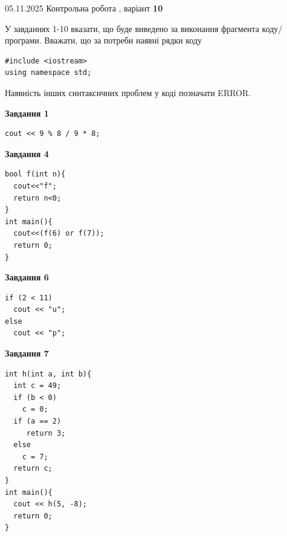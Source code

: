 \documentclass[12pt, ukrainian]{article}
\begin{document}
{\Large{05.11.2025 Контрольна робота , варіант  \No \textbf { 10 }\par}}
{
\begin {large}
У завданнях 1-10 вказати, що буде виведено за виконання фрагмента коду/про\-гра\-ми.
Вважати, що за потреби наявні рядки коду
\begin{verbatim}
#include <iostream>
using namespace std;
\end{verbatim}
Наявність інших синтаксичних проблем у коді позначати ERROR.

\begin{minipage}[t]{7.0cm}

\begin{center}
\textbf{Завдання 1}
\end{center}
\vspace{-8mm}

\begin{verbatim}
cout << 9 % 8 / 9 * 8;
\end{verbatim}



\begin{center}
\textbf{Завдання 4}
\end{center}
\vspace{-8mm}

\begin{verbatim}
bool f(int n){
  cout<<"f";
  return n<0;
}
int main(){
  cout<<(f(6) or f(7));
  return 0;
}
\end{verbatim}



\begin{center}
\textbf{Завдання 6}
\end{center}
\vspace{-8mm}

\begin{verbatim}
if (2 < 11)
  cout << "u";
else
  cout << "p";
\end{verbatim}



\begin{center}
\textbf{Завдання 7}
\end{center}
\vspace{-8mm}

\begin{verbatim}
int h(int a, int b){
  int c = 49;
  if (b < 0)
    c = 0;
  if (a == 2)
     return 3;
  else
    c = 7;
  return c;
}
int main(){
  cout << h(5, -8);
  return 0;
}
\end{verbatim}


\end{minipage}
\end{large}}
\end{document}
